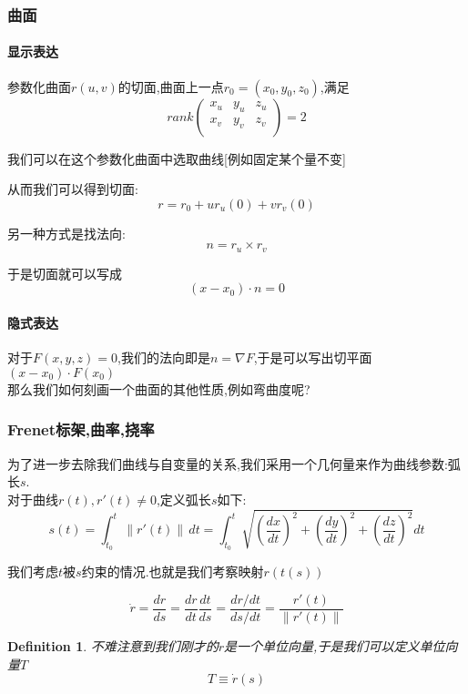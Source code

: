 \documentclass[11pt,hyperref,a4paper,UTF8]{ctexart}
\newtheorem{definition}{Definition}[subsection]
\newcommand{\parameter}[1]{\left(#1\right)}
\begin{document}
\begin{CJK}{UTF8}{gkai}
\subsubsection{曲面}
\paragraph{显示表达\\}

参数化曲面$r(u,v)$的切面,曲面上一点$r_0 = (x_0,y_0,z_0)$,满足
\[rank \begin{pmatrix}
  x_u&y_u&z_u\\
  x_v&y_v&z_v\\
\end{pmatrix} = 2\]

我们可以在这个参数化曲面中选取曲线[例如固定某个量不变]

从而我们可以得到切面:
\[r = r_0 + u r_u(0) + v r_v(0)\]

另一种方式是找法向:
\[n = r_u \times r_v\]

于是切面就可以写成
\[(x - x_0)\cdot n = 0\]

\paragraph{隐式表达\\}
对于$F(x,y,z) = 0$,我们的法向即是$n = \nabla F$,于是可以写出切平面$(x - x_0)\cdot F(x_0)$\\

那么我们如何刻画一个曲面的其他性质,例如弯曲度呢?

\subsubsection{Frenet标架,曲率,挠率}
为了进一步去除我们曲线与自变量的关系,我们采用一个几何量来作为曲线参数:弧长$s$.\\

对于曲线$r(t),r'(t) \neq 0$,定义弧长$s$如下:
\[s(t) = \int_{t_0}^{t}\|r'(t)\| \,dt = \int_{t_0}^{t}\sqrt{\parameter{\frac{dx}{dt}}^2 + \parameter{\frac{dy}{dt}}^2 + \parameter{\frac{dz}{dt}}^2} dt\]

我们考虑$t$被$s$约束的情况.也就是我们考察映射$r(t(s))$

\[\dot{r} = \frac{dr}{ds} = \frac{dr}{dt} \frac{dt}{ds} = \frac{dr /dt}{ds / dt} = \frac{r'(t)}{\|r'(t)\|}\]

\begin{definition}
  不难注意到我们刚才的$\dot{r}$是一个单位向量,于是我们可以定义单位向量$T$
  \[T \equiv \dot{r}(s)\]
\end{definition}


\end{CJK}
\end{document}
